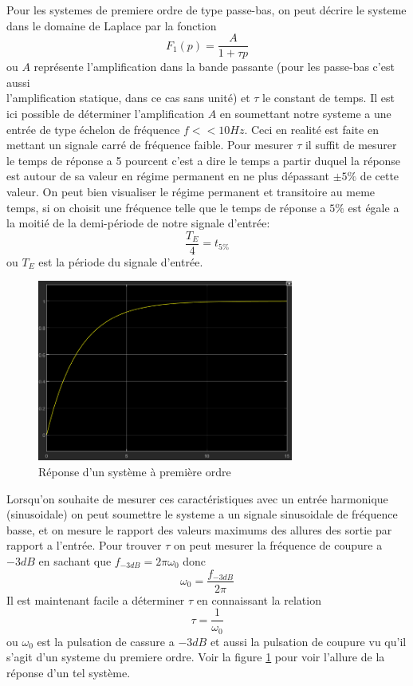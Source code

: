 \documentclass[12pt, a4paper]{report}
\begin{document}
Pour les systemes de premiere ordre de type passe-bas, on peut décrire le systeme dans le domaine de Laplace
par la fonction 
\[
    F_{1}(p) = \frac{A}{1 + \tau p}     
\]
ou $A$ représente l'amplification dans la bande passante (pour les passe-bas c'est aussi\\ l'amplification statique, dans ce cas sans unité)
et $\tau$ le constant de temps. Il est ici possible de déterminer l'amplification $A$ en soumettant notre systeme
a une entrée de type échelon de fréquence $f << 10Hz$. Ceci en realité est faite en mettant un signale carré de fréquence faible. Pour mesurer $\tau$ il suffit de mesurer le temps de réponse a 5 pourcent
c'est a dire le temps a partir duquel la réponse est autour de sa valeur en régime permanent en ne plus dépassant $\pm 5\%$ de cette valeur. On peut bien visualiser
le régime permanent et transitoire au meme temps, si on choisit une fréquence telle que le temps de réponse a $5\%$ est égale a la moitié de la demi-période de notre
signale d'entrée:
\[
    \frac{T_{E}}{4} = t_{5\%}
\]
ou $T_{E}$ est la période du signale d'entrée.
\par

\begin{figure}[h]
    \centering
    \includegraphics[width=0.75\textwidth]{reponse1erordregenerale.png}
    \caption{Réponse d'un système à première ordre}
    \label{fig:reponse1erordre}
\end{figure}

Lorsqu'on souhaite de mesurer ces caractéristiques avec un entrée harmonique (sinusoidale) on peut soumettre le systeme
a un signale sinusoidale de fréquence basse, et on mesure le rapport des valeurs maximums des allures des sortie par rapport a 
l'entrée. Pour trouver $\tau$ on peut mesurer la fréquence de coupure a $-3dB$ en sachant que 
$f_{-3dB} = 2 \pi \omega_{0}$ donc
\[
    \omega_{0} = \frac{f_{-3dB}}{2 \pi}
\]
Il est maintenant facile a déterminer $\tau$ en connaissant la relation
\[
    \tau = \frac{1}{\omega_{0}}
\]
ou $\omega_{0}$ est la pulsation de cassure a $-3dB$ et aussi la pulsation de coupure vu qu'il s'agit 
d'un systeme du premiere ordre. Voir la figure \ref{fig:reponse1erordre} 
pour voir l'allure de la réponse
d'un tel système.
\end{document}
